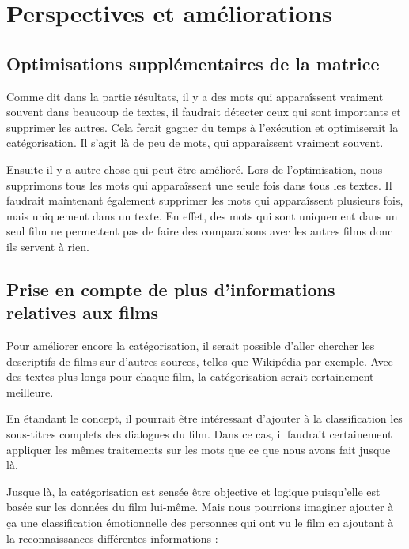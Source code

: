 \chapter{Perspectives et améliorations}
\section{Optimisations supplémentaires de la matrice}

Comme dit dans la partie résultats, il y a des mots qui apparaîssent vraiment souvent dans beaucoup de textes, il faudrait détecter ceux qui sont importants et supprimer les autres. Cela ferait gagner du temps à l'exécution et optimiserait la catégorisation. Il s'agit là de peu de mots, qui apparaîssent vraiment souvent.

Ensuite il y a autre chose qui peut être amélioré. Lors de l'optimisation, nous supprimons tous les mots qui apparaîssent une seule fois dans tous les textes. Il faudrait maintenant également supprimer les mots qui apparaîssent plusieurs fois, mais uniquement dans un texte. En effet, des mots qui sont uniquement dans un seul film ne permettent pas de faire des comparaisons avec les autres films donc ils servent à rien.

\section{Prise en compte de plus d'informations relatives aux films}

Pour améliorer encore la catégorisation, il serait possible d'aller chercher les descriptifs de films sur d'autres sources, telles que Wikipédia par exemple. Avec des textes plus longs pour chaque film, la catégorisation serait certainement meilleure.

En étandant le concept, il pourrait être intéressant d'ajouter à la classification les sous-titres complets des dialogues du film. Dans ce cas, il faudrait certainement appliquer les mêmes traitements sur les mots que ce que nous avons fait jusque là.

Jusque là, la catégorisation est sensée être objective et logique puisqu'elle est basée sur les données du film lui-même. Mais nous pourrions imaginer ajouter à ça une classification émotionnelle des personnes qui ont vu le film en ajoutant à la reconnaissances différentes informations : \\

